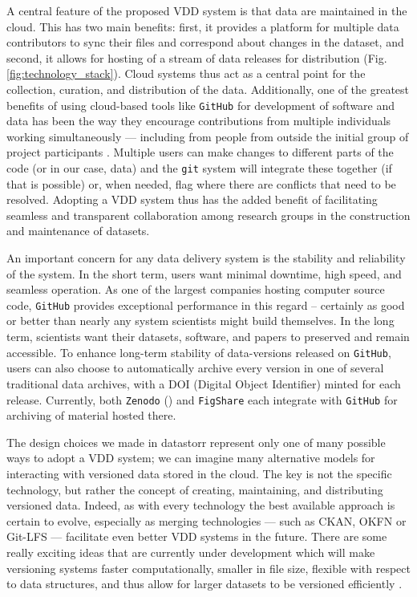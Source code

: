 \documentclass[a4paper,num-refs]{assets/oup-contemporary}
\begin{document}
A central feature of the proposed  VDD system is that data are maintained in the cloud. This has two main benefits: first, it provides a platform for multiple data contributors to sync their files and correspond about changes in the dataset, and second, it allows for hosting of a stream of data releases for distribution (Fig. \ref{fig:technology_stack}). Cloud systems thus act as a central point for the collection, curation, and distribution of the data. Additionally, one of the greatest benefits of using cloud-based tools like  \texttt{GitHub} for development of software and data has been the way they encourage contributions from multiple individuals working simultaneously --- including from people from outside the initial group of project participants \cite{Rogers-2013, Perkel-2016}. Multiple users can make changes to different parts of the code (or in our case, data) and the \texttt{git} system will integrate these together (if that is possible) or, when needed, flag where there are conflicts that need to be resolved. Adopting a VDD system thus has the added benefit of facilitating seamless and transparent collaboration among research groups in the construction and maintenance of datasets.

An important concern for any data delivery system is the stability and reliability of the system. In the short term, users want minimal downtime, high speed, and seamless operation. As one of the largest companies hosting computer source code, \texttt{GitHub} provides exceptional performance in this regard -- certainly as good or better than nearly any system scientists might build themselves. In the long term, scientists want their datasets, software, and papers to preserved and remain accessible. To enhance long-term stability of data-versions released on \texttt{GitHub}, users can also choose to automatically archive every version in one of several traditional data archives, with a DOI (Digital Object Identifier) minted for each release. Currently, both \texttt{Zenodo} () and  \texttt{FigShare}  each integrate with \texttt{GitHub} for archiving of material hosted there.

The design choices we made in datastorr represent only one of many possible ways to adopt a VDD system; we can imagine many alternative models for interacting with versioned data stored in the cloud. The key is not the specific technology, but rather the concept of creating, maintaining, and distributing versioned data. Indeed, as with every technology the best available approach is certain to evolve, especially as merging technologies --- such as CKAN, OKFN or Git-LFS --- facilitate even better VDD systems in the future.  There are some really exciting ideas that are currently under development which will make versioning systems faster computationally, smaller in file size, flexible with respect to data structures, and thus allow for larger datasets to be versioned efficiently \cite{Fli, Dat}. 
\end{document}
